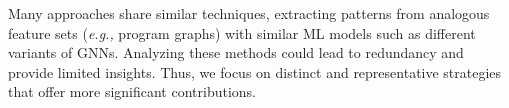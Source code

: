 

%
%
Many approaches share similar techniques, extracting patterns from analogous feature sets (\textit{e.g.,} program graphs) with similar ML models such as different variants of GNNs.
Analyzing these methods could lead to redundancy and provide limited insights.
Thus, we focus on distinct and representative strategies that offer more significant contributions.




